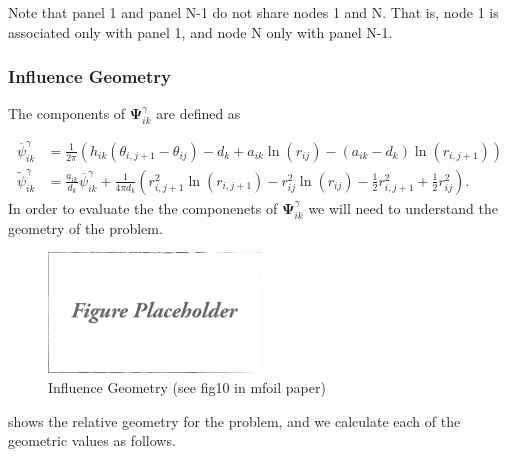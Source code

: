 \documentclass[]{article}
\begin{document}
\noindent Note that panel 1 and panel N-1 do not share nodes 1 and N. That is, node 1 is associated only with panel 1, and node N only with panel N-1. 


\subsubsection{Influence Geometry}

The components of \(\mathbf{\Psi}^\gamma_{ik}\) are defined as

\begin{align}
	\overline{\psi}^\gamma_{ik} &= \frac{1}{2\pi} \left( h_{ik} (\theta_{i,j+1} - \theta_{ij}) - d_k + a_{ik} \ln(r_{ij}) - (a_{ik}-d_k)\ln(r_{i,j+1}) \right) \\
	\widetilde{\psi}^\gamma_{ik} &=  \frac{a_{ik}}{d_k}\overline{\psi}^\gamma_{ik} + \frac{1}{4\pi d_k} \left(r^2_{i,j+1} \ln(r_{i,j+1}) - r^2_{ij} \ln(r_{ij}) - \frac{1}{2}r^2_{i,j+1} + \frac{1}{2}r^2_{ij} \right).
\end{align}
\noindent In order to evaluate the the componenets of \(\mathbf{\Psi}^\gamma_{ik}\) we will need to understand the geometry of the problem.

\begin{figure}[h]
	\centering
	\includegraphics[width=0.5\textwidth]{draft}
	\caption{Influence Geometry (see fig10 in mfoil paper)}
	\label{fig:influencegeometry}
\end{figure}

 shows the relative geometry for the problem, and we calculate each of the geometric values as follows.
\end{document}
